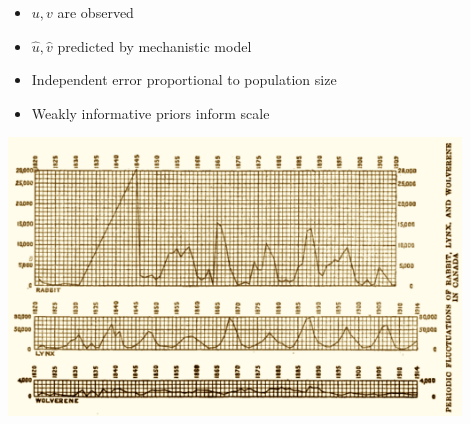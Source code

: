 \documentclass[10pt]{report}
\begin{document}
\begin{itemize}
\item $u, v$ are observed
\item $\hat{u}, \hat{v}$ predicted by mechanistic model
\item Independent error proportional to population size
\item Weakly informative priors inform scale
\end{itemize}

\begin{center}
\includegraphics[width=0.9\textwidth]{img/hudons-bay-data.png}
\end{center}
\end{document}
